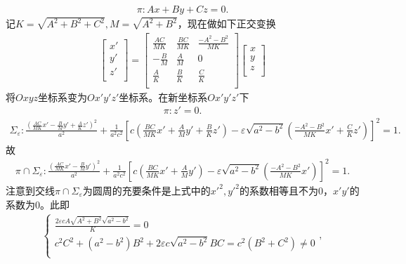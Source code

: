 \documentclass[../../main.tex]{subfiles}%
\begin{document}
\begin{solution}
\begin{align*}
\pi:Ax+By+Cz=0.
\end{align*}
记$K=\sqrt{A^2+B^2+C^2},M=\sqrt{A^2+B^2}$，现在做如下正交变换
\begin{align*}
\left[ \begin{array}{c}
x'\\
y'\\
z'\\
\end{array} \right] =\left[ \begin{matrix}
\frac{AC}{MK}&		\frac{BC}{MK}&		\frac{-A^2-B^2}{MK}\\
-\frac{B}{M}&		\frac{A}{M}&		0\\
\frac{A}{K}&		\frac{B}{K}&		\frac{C}{K}\\
\end{matrix} \right] \left[ \begin{array}{c}
x\\
y\\
z\\
\end{array} \right] 
\end{align*}
将$Oxyz$坐标系变为$Ox'y'z'$坐标系。在新坐标系$Ox'y'z'$下
\begin{align*}
\pi:z'=0.
\end{align*}
\begin{align*}
\Sigma _{\varepsilon}:\frac{\left( \frac{AC}{MK}x' -\frac{B}{M}y' +\frac{A}{K}z' \right) ^2}{a^2}+\frac{1}{a^2c^2}\left[ c\left( \frac{BC}{MK}x' +\frac{A}{M}y' +\frac{B}{K}z' \right) -\varepsilon \sqrt{a^2-b^2}\left( \frac{-A^2-B^2}{MK}x' +\frac{C}{K}z' \right) \right] ^2=1.
\end{align*}
故
\begin{align*}
\pi \cap \Sigma _{\varepsilon}:\frac{\left( \frac{AC}{MK}x' -\frac{B}{M}y' \right) ^2}{a^2}+\frac{1}{a^2c^2}\left[ c\left( \frac{BC}{MK}x' +\frac{A}{M}y' \right) -\varepsilon \sqrt{a^2-b^2}\left( \frac{-A^2-B^2}{MK}x' \right) \right] ^2=1.
\end{align*}
注意到交线$\pi \cap \Sigma_\varepsilon$为圆周的充要条件是上式中的$x'^2,y'^2$的系数相等且不为$0$，$x'y'$的系数为$0$。此即
\begin{align*}
\begin{cases}
\frac{2\varepsilon cA\sqrt{A^2+B^2}\sqrt{a^2-b^2}}{K}=0\\
c^2C^2+\left( a^2-b^2 \right) B^2+2\varepsilon c\sqrt{a^2-b^2}BC=c^2\left( B^2+C^2 \right) \ne 0\\
\end{cases},

\end{align*}
\end{solution}
\end{document}
